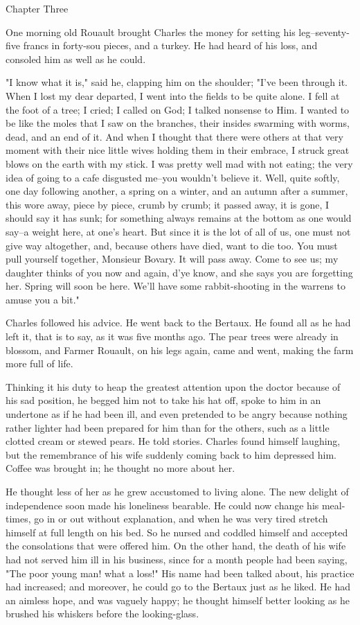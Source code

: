 \documentclass[11pt,twocolumn]{ltugboat}
\begin{document}
Chapter Three

One morning old Rouault brought Charles the money for setting his
leg--seventy-five francs in forty-sou pieces, and a turkey. He had heard
of his loss, and consoled him as well as he could.

"I know what it is," said he, clapping him on the shoulder; "I've been
through it. When I lost my dear departed, I went into the fields to be
quite alone. I fell at the foot of a tree; I cried; I called on God; I
talked nonsense to Him. I wanted to be like the moles that I saw on the
branches, their insides swarming with worms, dead, and an end of it.
And when I thought that there were others at that very moment with their
nice little wives holding them in their embrace, I struck great blows on
the earth with my stick. I was pretty well mad with not eating; the very
idea of going to a cafe disgusted me--you wouldn't believe it. Well,
quite softly, one day following another, a spring on a winter, and an
autumn after a summer, this wore away, piece by piece, crumb by crumb;
it passed away, it is gone, I should say it has sunk; for something
always remains at the bottom as one would say--a weight here, at one's
heart. But since it is the lot of all of us, one must not give way
altogether, and, because others have died, want to die too. You must
pull yourself together, Monsieur Bovary. It will pass away. Come to see
us; my daughter thinks of you now and again, d'ye know, and she says
you are forgetting her. Spring will soon be here. We'll have some
rabbit-shooting in the warrens to amuse you a bit."

Charles followed his advice. He went back to the Bertaux. He found all
as he had left it, that is to say, as it was five months ago. The pear
trees were already in blossom, and Farmer Rouault, on his legs again,
came and went, making the farm more full of life.

Thinking it his duty to heap the greatest attention upon the doctor
because of his sad position, he begged him not to take his hat off,
spoke to him in an undertone as if he had been ill, and even pretended
to be angry because nothing rather lighter had been prepared for him
than for the others, such as a little clotted cream or stewed pears. He
told stories. Charles found himself laughing, but the remembrance of his
wife suddenly coming back to him depressed him. Coffee was brought in;
he thought no more about her.

He thought less of her as he grew accustomed to living alone. The new
delight of independence soon made his loneliness bearable. He could now
change his meal-times, go in or out without explanation, and when he was
very tired stretch himself at full length on his bed. So he nursed and
coddled himself and accepted the consolations that were offered him.
On the other hand, the death of his wife had not served him ill in his
business, since for a month people had been saying, "The poor young
man! what a loss!" His name had been talked about, his practice had
increased; and moreover, he could go to the Bertaux just as he liked.
He had an aimless hope, and was vaguely happy; he thought himself better
looking as he brushed his whiskers before the looking-glass.
\end{document}

